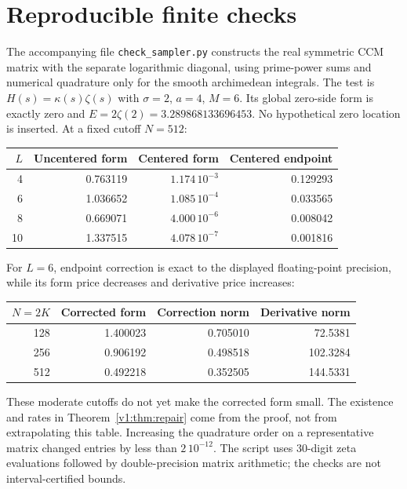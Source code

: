 \documentclass[11pt]{article}
\theoremstyle{remark}
\begin{document}
\appendix
\section{Reproducible finite checks}\label{app:numerics}

The accompanying file \texttt{check\_sampler.py} constructs the real symmetric CCM matrix with the
separate logarithmic diagonal, using prime-power sums and numerical
quadrature only for the smooth archimedean integrals. The test is
$H(s)=\kappa(s)\zeta(s)$ with $\sigma=2$, $a=4$, $M=6$. Its global
zero-side form is exactly zero and $E=2\zeta(2)=3.289868133696453$.
No hypothetical zero location is inserted. At a fixed cutoff $N=512$:
\begin{center}
\begin{tabular}{rrrr}
\toprule
$L$ & Uncentered form & Centered form & Centered endpoint\\
\midrule
4 & 0.763119 & $1.174\,10^{-3}$ & 0.129293\\
6 & 1.036652 & $1.085\,10^{-4}$ & 0.033565\\
8 & 0.669071 & $4.000\,10^{-6}$ & 0.008042\\
10 & 1.337515 & $4.078\,10^{-7}$ & 0.001816\\
\bottomrule
\end{tabular}
\end{center}
For $L=6$, endpoint correction is exact to the displayed floating-point
precision, while its form price decreases and derivative price increases:
\begin{center}
\begin{tabular}{rrrr}
\toprule
$N=2K$ & Corrected form & Correction norm & Derivative norm\\
\midrule
128 & 1.400023 & 0.705010 & 72.5381\\
256 & 0.906192 & 0.498518 & 102.3284\\
512 & 0.492218 & 0.352505 & 144.5331\\
\bottomrule
\end{tabular}
\end{center}
These moderate cutoffs do not yet make the corrected form small. The
existence and rates in Theorem~\ref{v1:thm:repair} come from the proof, not
from extrapolating this table. Increasing the quadrature order on a
representative matrix changed entries by less than $2\,10^{-12}$.
The script uses 30-digit zeta evaluations followed by double-precision
matrix arithmetic; the checks are not interval-certified bounds.
\end{document}
